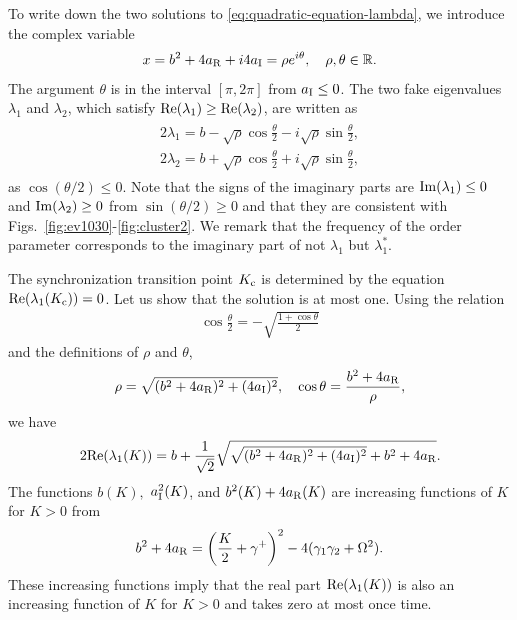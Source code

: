 To write down the two solutions to \eqref{eq:quadratic-equation-lambda},
we introduce the complex variable
\begin{align}
  x = b^{2} + 4a_{\rm R} + i 4a_{\rm I} = \rho e^{i\theta},
  \quad
  \rho,\theta\in\mathbb{R}.
\end{align}
The argument $\theta$ is in the interval $[\pi,2\pi]$ from $a_{\rm I}\leq 0$.
The two fake eigenvalues $\lambda_{1}$ and $\lambda_{2}$,
which satisfy ${\rm Re}(\lambda_{1})\geq{\rm Re}(\lambda_{2})$,
are written as
\begin{align}
\begin{aligned}
    2\lambda_{1} = b - \sqrt{\rho} \cos\frac{\theta}{2}
    - i \sqrt{\rho} \sin\frac{\theta}{2}, \\
    2\lambda_{2} = b + \sqrt{\rho} \cos\frac{\theta}{2}
    + i \sqrt{\rho} \sin\frac{\theta}{2},
\end{aligned}
\end{align}
as $\cos(\theta/2)\leq 0$. 
Note that the signs of the imaginary parts are
${\rm Im}(\lambda_{1})\leq 0$ and ${\rm Im}(\lambda_{2})\geq 0$
from $\sin(\theta/2)\geq 0$
and that they are consistent with
Figs.~\ref{fig:ev1030}-\ref{fig:cluster2}.
We remark that the frequency of the order parameter
  corresponds to the imaginary part of not $\lambda_{1}$ but $\lambda_{1}^{\ast}$.

The synchronization transition point $K_{\rm c}$ is determined
by the equation ${\rm Re}(\lambda_{1}(K_{\rm c}))=0$.
Let us show that the solution is at most one.
Using the relation
\begin{align}
  \cos\frac{\theta}{2} = - \sqrt{\frac{1+\cos\theta}{2}}
\end{align}
and the definitions of $\rho$ and $\theta$,
\begin{align}
  \rho = \sqrt{(b^{2}+4a_{\rm R})^{2}+(4a_{\rm I})^{2}},
  \quad
  \cos\theta = \frac{b^{2}+4a_{\rm R}}{\rho},
\end{align}  
we have
\begin{align}
  2{\rm Re}(\lambda_{1}(K))
  = b + \frac{1}{\sqrt{2}}
  \sqrt{ \sqrt{(b^{2}+4a_{\rm R})^{2}+(4a_{\rm I})^{2}} + b^{2}+4a_{\rm R} }.
\end{align}
The functions $b(K),$ $a_{\rm I}^{2}(K)$, and $b^{2}(K)+4a_{\rm R}(K)$
are increasing functions of $K$ for $K>0$ from
\begin{align}
  b^{2}+4a_{\rm R}
  = \left( \frac{K}{2} + \gamma^{+} \right)^{2} - 4(\gamma_{1}\gamma_{2}+\Omega^{2}).
\end{align}
These increasing functions imply that
the real part ${\rm Re}(\lambda_{1}(K))$ is
also an increasing function of $K$ for $K>0$
and takes zero at most once time.


